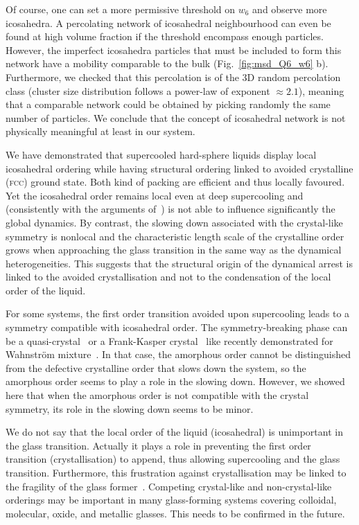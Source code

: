 Of course, one can set a more permissive threshold on $w_6$ and observe more icosahedra. A percolating network of icosahedral neighbourhood can even be found at high volume fraction if the threshold encompass enough particles. However, the imperfect icosahedra particles that must be included to form this network have a mobility comparable to the bulk (Fig.~\ref{fig:msd_Q6_w6} b). Furthermore, we checked that this percolation is of the 3D random percolation class (cluster size distribution follows a power-law of exponent $\approx 2.1$), meaning that a comparable network could be obtained by picking randomly the same number of particles. We conclude that the concept of icosahedral network is not physically meaningful at least in our system.



We have demonstrated that supercooled hard-sphere liquids display local icosahedral ordering while having structural ordering linked to avoided crystalline (\textsc{fcc}) ground state. Both kind of packing are efficient and thus locally favoured. Yet the icosahedral order remains local even at deep supercooling and (consistently with the arguments of~\citep{Berthier2007}) is not able to influence significantly the global dynamics. By contrast, the slowing down associated with the crystal-like symmetry is nonlocal and the characteristic length scale of the crystalline order grows when approaching the glass transition in the same way as the dynamical heterogeneities. This suggests that the structural origin of the dynamical arrest is linked to the avoided crystallisation and not to the condensation of the local order of the liquid.

For some systems, the first order transition avoided upon supercooling leads to a symmetry compatible with icosahedral order. The symmetry-breaking phase can be a quasi-crystal~\citep{Dzugutov1993} or a Frank-Kasper crystal~\citep{Frank1959,Frank1958} like recently demonstrated for Wahnstr\"om mixture~\citep{Pedersen2010}. In that case, the amorphous order cannot be distinguished from the defective crystalline order that slows down the system, so the amorphous order seems to play a role in the slowing down. However, we showed here that when the amorphous order is not compatible with the crystal symmetry, its role in the slowing down seems to be minor.

We do not say that the local order of the liquid (icosahedral) is unimportant in the glass transition. Actually it plays a role in preventing the first order transition (crystallisation) to append, thus allowing supercooling and the glass transition. Furthermore, this frustration against crystallisation may be linked to the fragility of the glass former~\citep{tanaka1999top}. Competing crystal-like and non-crystal-like orderings may be important in many glass-forming systems covering colloidal, molecular, oxide, and metallic glasses. This needs to be confirmed in the future. 

